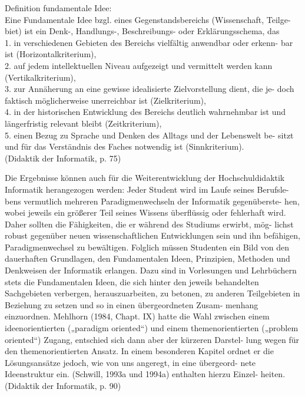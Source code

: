 Definition fundamentale Idee:\\
Eine  Fundamentale  Idee  bzgl.  eines  Gegenstandsbereichs  (Wissenschaft,  Teilge-
biet) ist ein Denk-, Handlungs-, Beschreibungs- oder Erklärungsschema, das \\
1.  in verschiedenen Gebieten des Bereichs vielfältig anwendbar oder erkenn-
bar ist (Horizontalkriterium), \\
2. auf  jedem  intellektuellen  Niveau  aufgezeigt  und  vermittelt  werden  kann 
(Vertikalkriterium), \\
3. zur  Annäherung  an  eine  gewisse  idealisierte  Zielvorstellung  dient,  die  je-
doch faktisch möglicherweise unerreichbar ist (Zielkriterium), \\
4. in der historischen Entwicklung des Bereichs deutlich wahrnehmbar ist und 
längerfristig relevant bleibt (Zeitkriterium), \\
5. einen Bezug zu Sprache und Denken des Alltags und der Lebenswelt be-
sitzt und für das Verständnis des Faches notwendig ist (Sinnkriterium). \\
(Didaktik der Informatik, p. 75)

Die  Ergebnisse  können  auch  für  die  Weiterentwicklung  der  Hochschuldidaktik 
Informatik herangezogen werden: Jeder Student wird im Laufe seines Berufsle-
bens vermutlich mehreren Paradigmenwechseln der Informatik gegenüberste-
hen, wobei jeweils ein größerer Teil seines Wissens überflüssig oder fehlerhaft 
wird. Daher sollten die Fähigkeiten, die er während des Studiums erwirbt, mög-
lichst robust gegenüber neuen wissenschaftlichen Entwicklungen sein und ihn 
befähigen,  Paradigmenwechsel  zu  bewältigen.  Folglich  müssen  Studenten  ein 
Bild von den dauerhaften Grundlagen, den Fundamentalen Ideen, Prinzipien, 
Methoden und Denkweisen der Informatik erlangen. Dazu sind in Vorlesungen 
und  Lehrbüchern  stets  die  Fundamentalen  Ideen,  die  sich  hinter  den  jeweils 
behandelten Sachgebieten verbergen, herauszuarbeiten, zu betonen, zu anderen 
Teilgebieten in Beziehung zu setzen und so in einen übergeordneten Zusam-
menhang  einzuordnen.  Mehlhorn  (1984,  Chapt. IX)  hatte  die  Wahl  zwischen 
einem  ideenorientierten  („paradigm  oriented“)  und  einem  themenorientierten 
(„problem oriented“) Zugang, entschied sich dann aber der kürzeren Darstel-
lung wegen für den themenorientierten Ansatz. In einem besonderen Kapitel 
ordnet er die Lösungsansätze jedoch, wie von uns angeregt, in eine übergeord-
nete  Ideenstruktur  ein.  (Schwill,  1993a  und  1994a)  enthalten  hierzu  Einzel-
heiten. 
(Didaktik der Informatik, p. 90)

